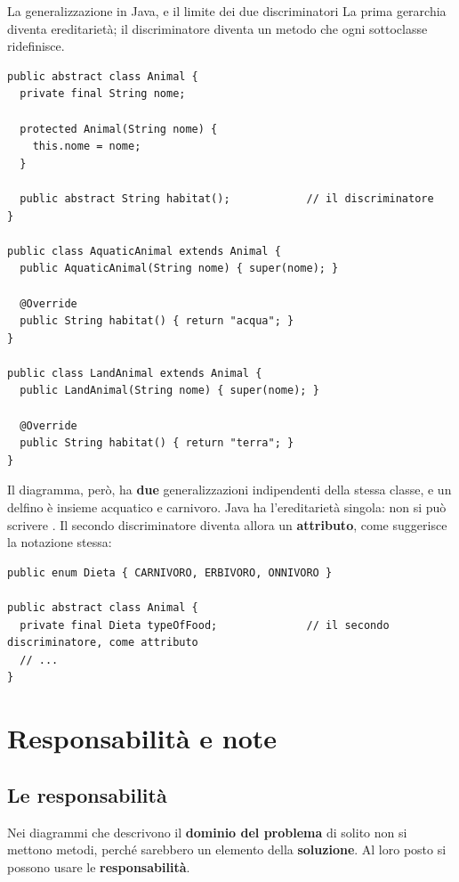 \begin{esempio}{La generalizzazione in Java, e il limite dei due discriminatori}
La prima gerarchia diventa ereditarietà; il discriminatore  diventa un metodo che ogni sottoclasse
ridefinisce.
\begin{lstlisting}[style=java, name=Animal.java]
public abstract class Animal {
  private final String nome;

  protected Animal(String nome) {
    this.nome = nome;
  }

  public abstract String habitat();            // il discriminatore
}

public class AquaticAnimal extends Animal {
  public AquaticAnimal(String nome) { super(nome); }

  @Override
  public String habitat() { return "acqua"; }
}

public class LandAnimal extends Animal {
  public LandAnimal(String nome) { super(nome); }

  @Override
  public String habitat() { return "terra"; }
}
\end{lstlisting}
Il diagramma, però, ha \textbf{due} generalizzazioni indipendenti della stessa classe, e un delfino è insieme acquatico e
carnivoro. Java ha l'ereditarietà singola: non si può scrivere . Il
secondo discriminatore diventa allora un \textbf{attributo}, come suggerisce la notazione stessa:
\begin{lstlisting}[style=java, name=Animal.java]
public enum Dieta { CARNIVORO, ERBIVORO, ONNIVORO }

public abstract class Animal {
  private final Dieta typeOfFood;              // il secondo discriminatore, come attributo
  // ...
}
\end{lstlisting}
\end{esempio}

\section{Responsabilità e note}

\subsection{Le responsabilità}

Nei diagrammi che descrivono il \textbf{dominio del problema} di solito non si mettono metodi, perché sarebbero un elemento
della \textbf{soluzione}. Al loro posto si possono usare le \textbf{responsabilità}.

